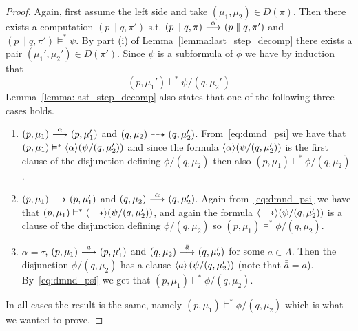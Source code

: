 \begin{proof}
    \par\nobreak
    \ltr Again, first assume the left side and take $(\mu_1,\mu_2)\in D(\pi)$. Then
    there exists a computation $(p\parallel q, \pi')$ s.t. $(p\parallel q, \pi) \ {\stackrel{{\alpha}}{\longrightarrow}}\ 
    (p\parallel q, \pi')$ and $(p\parallel q, \pi') \vDash^* \psi$.
    By part (i) of
    Lemma~\ref{lemma:last_step_decomp} there exists a pair $(\mu_1',\mu_2')\in D(\pi')$.
    Since $\psi$ is a subformula of $\phi$ we have by induction that
    \begin{equation}\label{eq:dmnd_psi}
        (p,\mu_1') \vDash^* \psi / (q,\mu_2')
    \end{equation}
    Lemma~\ref{lemma:last_step_decomp} also states that one of the following three cases holds.
    \begin{enumerate}
        \item $(p,\mu_1)\ {\stackrel{{\alpha}}{\longrightarrow}}\ (p,\mu_1')$ and $(q,\mu_2)\ {\stackrel{_{}}{\dashrightarrow}}\ (q,\mu_2')$.
            From~\eqref{eq:dmnd_psi} we have that $(p,\mu_1) \vDash^*
            \mbox{\ensuremath{\langle \alpha \rangle}}(\psi/(q,\mu_2'))$ and since 
            the formula $\mbox{\ensuremath{\langle \alpha \rangle}}(\psi/(q,\mu_2'))$
            is the first clause of the
            disjunction defining 
            $\phi/(q,\mu_2)$ then also $(p,\mu_1) \vDash^* \phi/(q,\mu_2)$.
        \item $(p,\mu_1)\ {\stackrel{_{}}{\dashrightarrow}}\ (p,\mu_1')$ and $(q,\mu_2)\ {\stackrel{{\alpha}}{\longrightarrow}}\ (q,\mu_2')$.
            Again from~\eqref{eq:dmnd_psi} we have that $(p,\mu_1) \vDash^*
            \mbox{\ensuremath{\langle\stackrel{_{}}{\dashrightarrow}\rangle}}(\psi/(q,\mu_2'))$, and again
            the formula $\mbox{\ensuremath{\langle\stackrel{_{}}{\dashrightarrow}\rangle}}(\psi/(q,\mu_2'))$
            is a clause of the disjunction defining
            $\phi/(q,\mu_2)$ so $(p,\mu_1) \vDash^* \phi/(q,\mu_2)$.
        \item $\alpha = \tau$, $(p,\mu_1) \ {\stackrel{{a}}{\longrightarrow}}\  (p,\mu_1')$ and $(q,\mu_2)
            \ {\stackrel{{\bar{a}}}{\longrightarrow}}\  (q,\mu_2')$ for some $a\in A$. Then the disjunction
            $\phi/(q,\mu_2)$ has a clause $\mbox{\ensuremath{\langle a \rangle}}\left( \psi / (q,\mu_2') \right)$
            (note that $\bar{\bar{a}} = a$). By~\eqref{eq:dmnd_psi} we get that
            $(p,\mu_1) \vDash^* \phi / (q,\mu_2)$.
    \end{enumerate}
    In all cases the result is the same, namely $(p,\mu_1) \vDash^* \phi / (q,\mu_2)$
    which is what we wanted to prove.


\end{proof}
